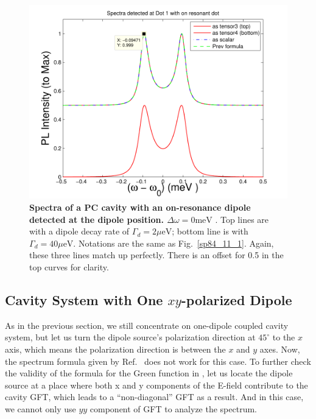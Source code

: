 \begin{figure}[H]
\centering
\begin{center}
\includegraphics[width=14cm]{./Figs/sp84_11_2}
\end{center}
\caption[Spectra of a PC cavity with an on-resonance dipole.]{\textbf{Spectra of a PC cavity with an on-resonance dipole detected at the dipole position. $\Delta \omega = 0 {\text {meV}}$ }. Top lines are with a dipole decay rate of $\Gamma_d = 2 \mu{\text {eV}}$; bottom line is with $\Gamma_d = 40 \mu{\text {eV}}$. Notations are the same as Fig.~\ref{sp84_11_1}. Again, these three lines match up perfectly. There is an offset for 0.5 in the top curves for clarity.}
\label{sp84_11_2}
\end{figure}

\clearpage

\subsection{Cavity System with One $xy$-polarized Dipole}
As in the previous section, we still concentrate on one-dipole coupled cavity system,
but let us turn the dipole source's polarization direction at $45^\circ$ to the $x$ axis,
which means the polarization direction is between the $x$ and $y$ axes.
Now, the spectrum formula given by Ref.~\cite{Hughes2009} does not work for this case.
To further check the validity of the formula for the Green function in \cite{Hughes2009},
let us locate the dipole source at a place where both x and y components of the E-field contribute to the cavity GFT,
which leads to a ``non-diagonal'' GFT as a result.
And in this case, we cannot only use $yy$ component of GFT to analyze the spectrum.

